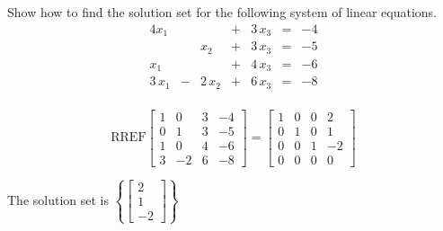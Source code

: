 
\begin{exerciseStatement}


Show how to find the solution set for the following system of linear equations. 
\begin{alignat*}{4} x_{1} & &  &+& 3 \, x_{3} &=& -4 \\ & & x_{2} &+& 3 \, x_{3} &=& -5 \\x_{1} & &  &+& 4 \, x_{3} &=& -6 \\3 \, x_{1} &-& 2 \, x_{2} &+& 6 \, x_{3} &=& -8 \\ \end{alignat*}
            


\end{exerciseStatement}
    
\begin{exerciseAnswer} 
\[\mathrm{RREF} \left[\begin{array}{ccc|c}
1 & 0 & 3 & -4 \\
0 & 1 & 3 & -5 \\
1 & 0 & 4 & -6 \\
3 & -2 & 6 & -8
\end{array}\right]  =  \left[\begin{array}{ccc|c}
1 & 0 & 0 & 2 \\
0 & 1 & 0 & 1 \\
0 & 0 & 1 & -2 \\
0 & 0 & 0 & 0
\end{array}\right] \]

The solution set is \( \left\{ \left[\begin{array}{c}
2 \\
1 \\
-2
\end{array}\right] \right\} \)


\end{exerciseAnswer}
    
